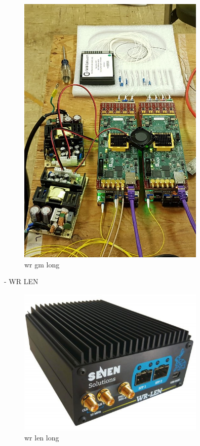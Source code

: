 \begin{figure}
    \includegraphics[width=0.8\textwidth]{diagrams/5-daq/wr_gm.jpg}
    \caption[wr gm short]{wr gm long}
    \label{fig:wr_gm}
\end{figure}
- WR LEN
\begin{figure}
    \includegraphics[width=0.8\textwidth]{diagrams/5-daq/wr_len.jpg}
    \caption[wr len short]{wr len long}
    \label{fig:wr_len}
\end{figure}
